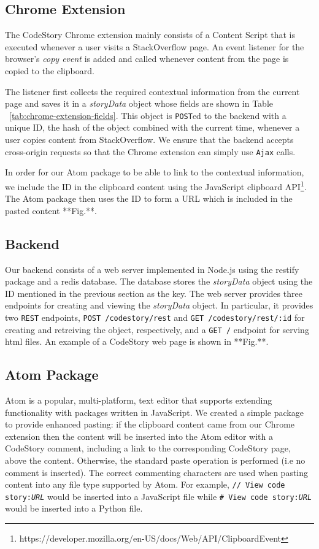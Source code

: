 \documentclass[../manifest.tex]{subfiles}
\begin{document}
\subsection{Chrome Extension}
The CodeStory Chrome extension mainly consists of a Content Script that is executed whenever a user visits a StackOverflow page. An event listener for the browser's \textit{copy event} is added and called whenever content from the page is copied to the clipboard.

The listener first collects the required contextual information from the current page and saves it in a \textit{storyData} object whose fields are shown in Table ~\ref{tab:chrome-extension-fields}. This object is \texttt{POST}ed to the backend
with a unique ID, the hash of the object combined with the current time, whenever a user copies content from StackOverflow. We ensure that the backend accepts cross-origin requests so that the Chrome extension can simply use \texttt{Ajax} calls.

In order for our Atom package to be able to link to the contextual information, we include the ID in the clipboard content using the JavaScript clipboard API\footnote{https://developer.mozilla.org/en-US/docs/Web/API/ClipboardEvent}. The Atom package then uses the ID to form a URL which is included in the pasted content **Fig.**.

\subsection{Backend}
Our backend consists of a web server implemented in Node.js using the restify package and a redis database. The database stores the \textit{storyData} object using the ID mentioned in the previous section as the key. The web server provides three endpoints for creating and viewing the \textit{storyData} object. In particular, it provides two \texttt{REST} endpoints, \texttt{POST /codestory/rest} and \texttt{GET /codestory/rest/:id} for creating and retreiving the object, respectively, and a \texttt{GET /} endpoint for serving html files. An example of a CodeStory web page is shown in **Fig.**.

\subsection{Atom Package}
Atom is a popular, multi-platform, text editor that supports extending functionality with packages written in JavaScript. We created a simple package to provide enhanced pasting: if the clipboard content came from our Chrome extension then the content will be inserted into the Atom editor with a CodeStory comment, including a link to the corresponding CodeStory page, above the content. Otherwise, the standard paste operation is performed (i.e no comment is inserted). The correct commenting characters are used when pasting content into any file type supported by Atom. For example, \texttt{// View code story:\textit{URL}} would be inserted into a JavaScript file while \texttt{\# View code story:\textit{URL}} would be inserted into a Python file.
\end{document}
